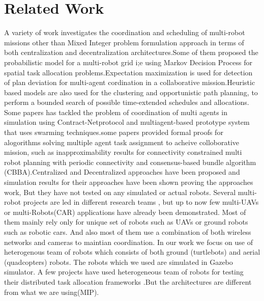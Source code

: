 \documentclass[conference]{IEEEtran}
\begin{document}
\section{Related Work}
A variety of work investigates the coordination and scheduling of multi-robot missions other than Mixed Integer problem formulation approach in terms of both centralization and decentralization architectures.Some of them proposed the probabilistic model for a multi-robot grid i;e using Markov Decision Process for spatial task allocation problems\cite{claes2015effective}\cite{di2011decentralized}\cite{ponda2015cooperative}.Expectation maximization is used for detection of plan deviation for multi-agent cordination in a collaborative mission\cite{claes2015effective}\cite{banerjee2016detection}.Heuristic based models are also used for the clustering and opportunistic path planning, to perform a bounded search of possible time-extended schedules and allocations\cite{jones2011time}\cite{maza2011distributed}\cite{jones2011time}.
Some papers has tackled the problem of coordination of multi agents in simulation using Contract-Netprotocol\cite{lemaire2004distributed} and multiagent-based prototype system that uses swarming techniques\cite{dasgupta2008multiagent}.some papers provided formal proofs for alogorithms solving multiple agent task assignment to acheive colloborative mission, such as inapproximability results for connectivity constrained multi robot planning with periodic connectivity\cite{hollinger2012multirobot} and consensus-based bundle algorithm (CBBA)\cite{choi2009consensus}\cite{ponda2010decentralized}.Centralized and Decentralized approaches have been proposed and simulation results for their approaches have been shown proving the approaches work, But they have not tested on any simulated or actual robots\cite{feo2016decentralized}\cite{flushing2014mathematical}\cite{galceran2013survey}.
Several multi-robot projects are led in different research teams , but up to now few multi-UAVs or multi-Robots(CAR) applications have already been demonstrated\cite{gancet2005task}\cite{gancet2005task}. Most of them mainly rely only for unique set of robots such as UAVs or ground robots such as robotic cars. And also most of them use a combination of both wireless networks and cameras to maintian coordination. In our work we focus on use of heterogenous team of robots which consists of both ground (turtlebots) and aerial (quadcopters) robots. The robots which we used are simulated in Gazebo simulator. A few projects have used heterogeneous team of robots for testing their  distributed task allocation frameworks \cite{ponda2010decentralized} \cite{sariel2011generic}\cite{shiroma2009comutar}.But the architectures are different from what we are using(MIP). 
\end{document}
